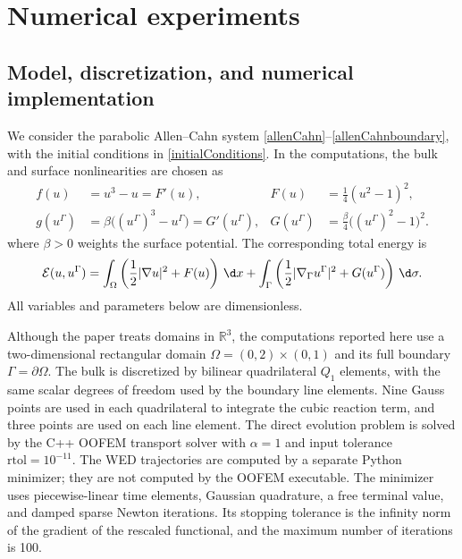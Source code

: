 \section{Numerical experiments}
\label{section:numerical}

\subsection{Model, discretization, and numerical implementation}
We consider the parabolic Allen--Cahn system \eqref{allenCahn}--\eqref{allenCahnboundary}, with the initial conditions in \eqref{initialConditions}. In the computations, the bulk and surface nonlinearities are chosen as
\begin{equation}
\label{num:potential}
\begin{aligned}
 f(u)&=u^3-u=F'(u), & F(u)&=\frac14(u^2-1)^2,\\
 g(u^\Gamma)&=\beta\bigl((u^\Gamma)^3-u^\Gamma\bigr)=G'(u^\Gamma), &
 G(u^\Gamma)&=\frac{\beta}{4}\bigl((u^\Gamma)^2-1\bigr)^2.
\end{aligned}
\end{equation}
where $\beta>0$ weights the surface potential. The corresponding total energy is
\begin{equation}
\label{num:energy}
\mathcal E(u,u^\Gamma)=\int_\Omega\left(\frac12|\nabla u|^2+F(u)\right)\,\d x
+\int_\Gamma\left(\frac12|\nabla_\Gamma u^\Gamma|^2+G(u^\Gamma)\right)\,\d\sigma.
\end{equation}
All variables and parameters below are dimensionless.

Although the paper treats domains in $\mathbb R^3$, the computations reported here use a two-dimensional rectangular domain $\Omega=(0,2)\times(0,1)$ and its full boundary $\Gamma=\partial\Omega$. The bulk is discretized by bilinear quadrilateral $Q_1$ elements, with the same scalar degrees of freedom used by the boundary line elements. Nine Gauss points are used in each quadrilateral to integrate the cubic reaction term, and three points are used on each line element. The direct evolution problem is solved by the C++ OOFEM transport solver with $\alpha=1$ and input tolerance $\mathrm{rtol}=10^{-11}$. The WED trajectories are computed by a separate Python minimizer; they are not computed by the OOFEM executable. The minimizer uses piecewise-linear time elements, Gaussian quadrature, a free terminal value, and damped sparse Newton iterations. Its stopping tolerance is the infinity norm of the gradient of the rescaled functional, and the maximum number of iterations is 100.

